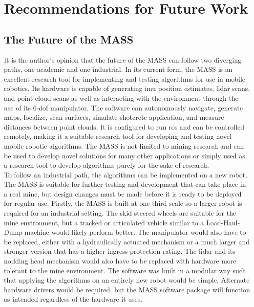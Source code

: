 \section{Recommendations for Future Work}
\subsection{The Future of the MASS}

It is the author's opinion that the future of the MASS can follow two diverging paths, one academic and one industrial. In its current form, the MASS is an excellent research tool for implementing and testing algorithms for use in mobile robotics. Its hardware is capable of generating \acrshort{imu} position estimates, \acrshort{lidar} scans, and point cloud scans as well as interacting with the environment through the use of its 6-\acrshort{dof} manipulator. The software can autonomously navigate, generate maps, localize, scan surfaces, simulate shotcrete application, and measure distances between point clouds. It is configured to run \acrshort{ros} and can be controlled remotely, making it a suitable research tool for developing and testing novel mobile robotic algorithms. The MASS is not limited to mining research and can be used to develop novel solutions for many other applications or simply used as a research tool to develop algorithms purely for the sake of research.\\

To follow an industrial path, the algorithms can be implemented on a new robot. The MASS is suitable for further testing and development that can take place in a real mine, but design changes must be made before it is ready to be deployed for regular use. Firstly, the MASS is built at one third scale so a larger robot is required for an industrial setting. The skid steered wheels are suitable for the mine environment, but a tracked or articulated vehicle similar to a Load-Haul-Dump machine would likely perform better. The manipulator would also have to be replaced, either with a hydraulically actuated mechanism or a much larger and stronger version that has a higher ingress protection rating. The \acrshort{lidar} and its nodding head mechanism would also have to be replaced with hardware more tolerant to the mine environment. The software was built in a modular way such that applying the algorithms on an entirely new robot would be simple. Alternate hardware drivers would be required, but the MASS software package will function as intended regardless of the hardware it uses.\\


